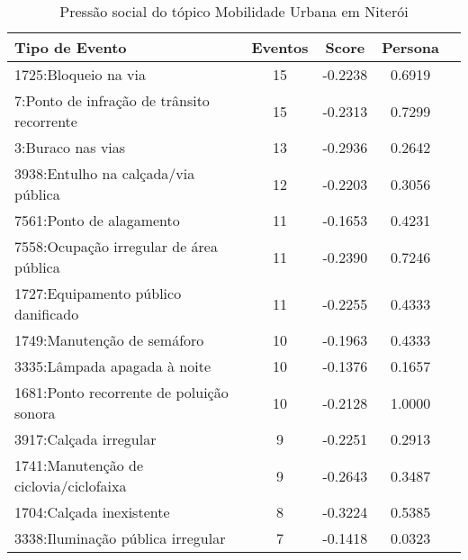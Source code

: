\begin{table}[htbp]
	\centering
	\caption{Pressão social do tópico Mobilidade Urbana em Niterói}
	\label{tab:eventos_populares_mobility_niteroi}
	\begin{tabular}{|l|c|c|c|c|}
		\hline
		\textbf{Tipo de Evento}                             & \textbf{Eventos} & \textbf{Score} & \textbf{Persona} \\
		\hline
		1725:Bloqueio na via                                & 15               & -0.2238        & 0.6919           \\
		\hline
		7:Ponto de infração de trânsito recorrente          & 15               & -0.2313        & 0.7299           \\
		\hline
		3:Buraco nas vias                                   & 13               & -0.2936        & 0.2642           \\
		\hline
		3938:Entulho na calçada/via pública                 & 12               & -0.2203        & 0.3056           \\
		\hline
		7561:Ponto de alagamento                            & 11               & -0.1653        & 0.4231           \\
		\hline
		7558:Ocupação irregular de área pública             & 11               & -0.2390        & 0.7246           \\
		\hline
		1727:Equipamento público danificado                 & 11               & -0.2255        & 0.4333           \\
		\hline
		1749:Manutenção de semáforo                         & 10               & -0.1963        & 0.4333           \\
		\hline
		3335:Lâmpada apagada à noite                        & 10               & -0.1376        & 0.1657           \\
		\hline
		1681:Ponto recorrente de poluição sonora            & 10               & -0.2128        & 1.0000           \\
		\hline
		3917:Calçada irregular                              & 9                & -0.2251        & 0.2913           \\
		\hline
		1741:Manutenção de ciclovia/ciclofaixa              & 9                & -0.2643        & 0.3487           \\
		\hline
		1704:Calçada inexistente                            & 8                & -0.3224        & 0.5385           \\
		\hline
		3338:Iluminação pública irregular                   & 7                & -0.1418        & 0.0323           \\

\end{tabular}
\end{table}
